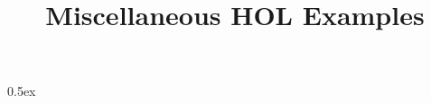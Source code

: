 \documentclass[11pt,a4paper]{article}
\begin{document}
\title{Miscellaneous HOL Examples}
\maketitle

\tableofcontents

\parindent 0pt\parskip 0.5ex

\end{document}
